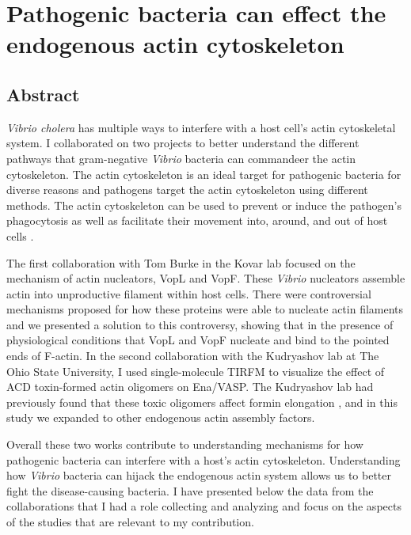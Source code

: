 \chapter{Pathogenic bacteria can effect the endogenous actin cytoskeleton}\label{ch:vibrio}

\section[Abstract]{Abstract\footnotemark}
\textit{Vibrio cholera} has multiple ways to interfere with a host cell’s actin cytoskeletal system. I collaborated on two projects to better understand the different pathways that gram-negative \textit{Vibrio} bacteria can commandeer the actin cytoskeleton. The actin cytoskeleton is an ideal target for pathogenic bacteria for diverse reasons and pathogens target the actin cytoskeleton using different methods. The actin cytoskeleton can be used to prevent or induce the pathogen's phagocytosis as well as facilitate their movement into, around, and out of host cells \citep{liverman_arp2/3-independent_2007}. 

The first collaboration with Tom Burke in the Kovar lab focused on the mechanism of actin nucleators, VopL and VopF. These \textit{Vibrio} nucleators assemble actin into unproductive filament within host cells. There were controversial mechanisms proposed for how these proteins were able to nucleate actin filaments and we presented a solution to this controversy, showing that in the presence of physiological conditions that VopL and VopF nucleate and bind to the pointed ends of F-actin. In the second collaboration with the Kudryashov lab at The Ohio State University, I used single-molecule TIRFM to visualize the effect of ACD toxin-formed actin oligomers on Ena/VASP. The Kudryashov lab had previously found that these toxic oligomers affect formin elongation \citep{heisler_acd_2015}, and in this study we expanded to other endogenous actin assembly factors. 

Overall these two works contribute to understanding mechanisms for how pathogenic bacteria can interfere with a host's actin cytoskeleton. Understanding how \textit{Vibrio} bacteria can hijack the endogenous actin system allows us to better fight the disease-causing bacteria. I have presented below the data from the collaborations that I had a role collecting and analyzing and focus on the aspects of the studies that are relevant to my contribution. 


